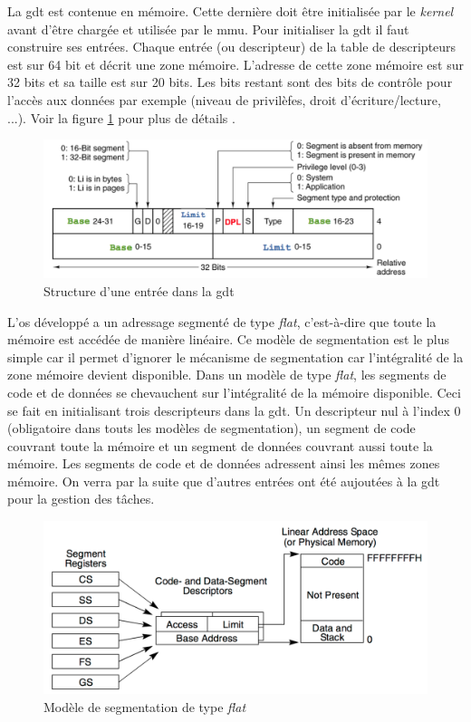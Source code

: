 La \acrshort{gdt} est contenue en mémoire. Cette dernière doit être initialisée
par le \textit{kernel} avant d'être chargée et utilisée par le \acrshort{mmu}.
Pour initialiser la \acrshort{gdt} il faut construire ses entrées. Chaque entrée
(ou descripteur) de la table de descripteurs est sur 64 bit et décrit une zone
mémoire. L'adresse de cette zone mémoire est sur 32 bits et sa taille est sur 20
bits. Les bits restant sont des bits de contrôle pour l'accès aux données par
exemple (niveau de privilèfes, droit d'écriture/lecture, ...). Voir la figure
\ref{gdt_entry} pour plus de détails \cite{ref42,ref14}. \newpage

\begin{figure}[!h]
  \centering
  \includegraphics[scale=0.75]{images/gdt_entry.png}
  \caption{Structure d'une entrée dans la \acrshort{gdt}}
  \label{gdt_entry}
\end{figure}

L'\acrshort{os} développé a un adressage segmenté de type \textit{flat}, c'est-à-dire
que toute la mémoire est accédée de manière linéaire. Ce modèle de segmentation
est le plus simple car il permet d'ignorer le mécanisme de segmentation car
l'intégralité de la zone mémoire devient disponible. Dans un modèle de type \textit{flat},
les segments de code et de données se chevauchent sur l'intégralité de la mémoire
disponible. Ceci se fait en initialisant trois descripteurs dans la \acrshort{gdt}.
Un descripteur nul à l'index 0 (obligatoire dans touts les modèles de segmentation),
un segment de code couvrant toute la mémoire et un segment de données couvrant
aussi toute la mémoire. Les segments de code et de données adressent ainsi les mêmes
zones mémoire. On verra par la suite que d'autres entrées ont été aujoutées à la
\acrshort{gdt} pour la gestion des tâches. \\

\begin{figure}[!h]
  \centering
  \includegraphics[scale=0.6]{images/flat.png}
  \caption{Modèle de segmentation de type \textit{flat}}
  \label{flat}
\end{figure}


